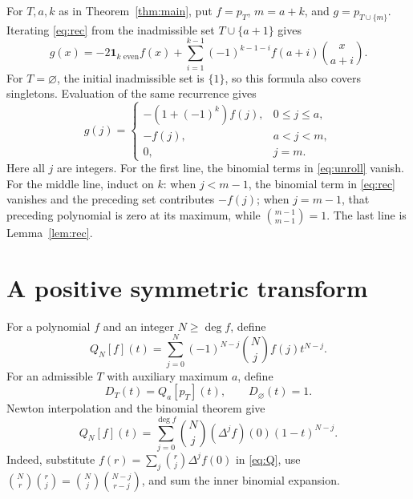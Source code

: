 \documentclass[11pt]{article}
\theoremstyle{definition}
\newcommand{\ind}{\mathbf 1}
\begin{document}
For $T,a,k$ as in Theorem~\ref{thm:main}, put $f=p_T$, $m=a+k$, and $g=p_{T\cup\{m\}}$. Iterating \eqref{eq:rec} from the inadmissible set $T\cup\{a+1\}$ gives
\begin{equation}\label{eq:unroll}
 g(x)=-2\ind_{k\text{ even}}f(x)
       +\sum_{i=1}^{k-1}(-1)^{k-1-i}f(a+i)\binom{x}{a+i}.
\end{equation}
For $T=\varnothing$, the initial inadmissible set is $\{1\}$, so this formula also covers singletons. Evaluation of the same recurrence gives
\begin{equation}\label{eq:values}
 g(j)=
 \begin{cases}
  -(1+(-1)^k)f(j),&0\le j\le a,\\
  -f(j),&a<j<m,\\
  0,&j=m.
 \end{cases}
\end{equation}
Here all $j$ are integers. For the first line, the binomial terms in \eqref{eq:unroll} vanish. For the middle line, induct on $k$: when $j<m-1$, the binomial term in \eqref{eq:rec} vanishes and the preceding set contributes $-f(j)$; when $j=m-1$, that preceding polynomial is zero at its maximum, while $\binom{m-1}{m-1}=1$. The last line is Lemma~\ref{lem:rec}.

\section{A positive symmetric transform}
For a polynomial $f$ and an integer $N\ge\deg f$, define
\begin{equation}\label{eq:Q}
 Q_N[f](t)=\sum_{j=0}^N(-1)^{N-j}\binom Nj f(j)t^{N-j}.
\end{equation}
For an admissible $T$ with auxiliary maximum $a$, define
\[
 D_T(t)=Q_a[p_T](t),\qquad D_\varnothing(t)=1.
\]
Newton interpolation and the binomial theorem give
\begin{equation}\label{eq:newton}
 Q_N[f](t)=\sum_{j=0}^{\deg f}\binom Nj(\Delta^j f)(0)(1-t)^{N-j}.
\end{equation}
Indeed, substitute $f(r)=\sum_j\binom rj\Delta^j f(0)$ in \eqref{eq:Q}, use $\binom Nr\binom rj=\binom Nj\binom{N-j}{r-j}$, and sum the inner binomial expansion.
\end{document}
